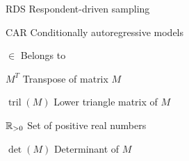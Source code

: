 \begin{siglas}
    \item[RDS] Respondent-driven sampling
    \item[CAR] Conditionally autoregressive models
  \end{siglas}
  
  \begin{simbolos}
    \item[$\in$] Belongs to 
    \item[$M^T$] Transpose of matrix $M$
    \item[$\operatorname{tril}(M)$] Lower triangle matrix of $M$
    \item[$\mathbb{R}_{>0}$] Set of positive real numbers
    \item[$\det(M)$] Determinant of $M$ 
  \end{simbolos}